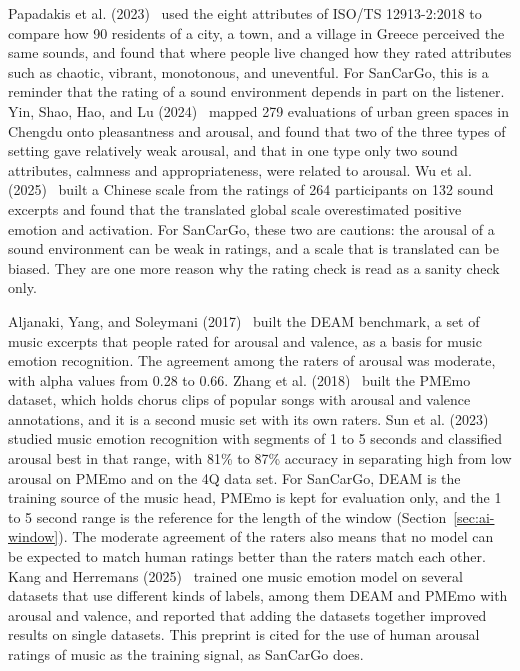 Papadakis et al. (2023)~\cite{papadakis2023city} used the eight attributes of ISO/TS 12913-2:2018 to compare how 90 residents of a city, a town, and a village in Greece perceived the same sounds, and found that where people live changed how they rated attributes such as chaotic, vibrant, monotonous, and uneventful. For SanCarGo, this is a reminder that the rating of a sound environment depends in part on the listener. Yin, Shao, Hao, and Lu (2024)~\cite{yin2024soundscape} mapped 279 evaluations of urban green spaces in Chengdu onto pleasantness and arousal, and found that two of the three types of setting gave relatively weak arousal, and that in one type only two sound attributes, calmness and appropriateness, were related to arousal. Wu et al. (2025)~\cite{wu2025untranslatability} built a Chinese scale from the ratings of 264 participants on 132 sound excerpts and found that the translated global scale overestimated positive emotion and activation. For SanCarGo, these two are cautions: the arousal of a sound environment can be weak in ratings, and a scale that is translated can be biased. They are one more reason why the rating check is read as a sanity check only.

Aljanaki, Yang, and Soleymani (2017)~\cite{aljanaki2017deam} built the DEAM benchmark, a set of music excerpts that people rated for arousal and valence, as a basis for music emotion recognition. The agreement among the raters of arousal was moderate, with alpha values from 0.28 to 0.66. Zhang et al. (2018)~\cite{zhang2018pmemo} built the PMEmo dataset, which holds chorus clips of popular songs with arousal and valence annotations, and it is a second music set with its own raters. Sun et al. (2023)~\cite{sun2023segmented} studied music emotion recognition with segments of 1 to 5 seconds and classified arousal best in that range, with 81\% to 87\% accuracy in separating high from low arousal on PMEmo and on the 4Q data set. For SanCarGo, DEAM is the training source of the music head, PMEmo is kept for evaluation only, and the 1 to 5 second range is the reference for the length of the window (Section~\ref{sec:ai-window}). The moderate agreement of the raters also means that no model can be expected to match human ratings better than the raters match each other. Kang and Herremans (2025)~\cite{kang2025unified} trained one music emotion model on several datasets that use different kinds of labels, among them DEAM and PMEmo with arousal and valence, and reported that adding the datasets together improved results on single datasets. This preprint is cited for the use of human arousal ratings of music as the training signal, as SanCarGo does.

